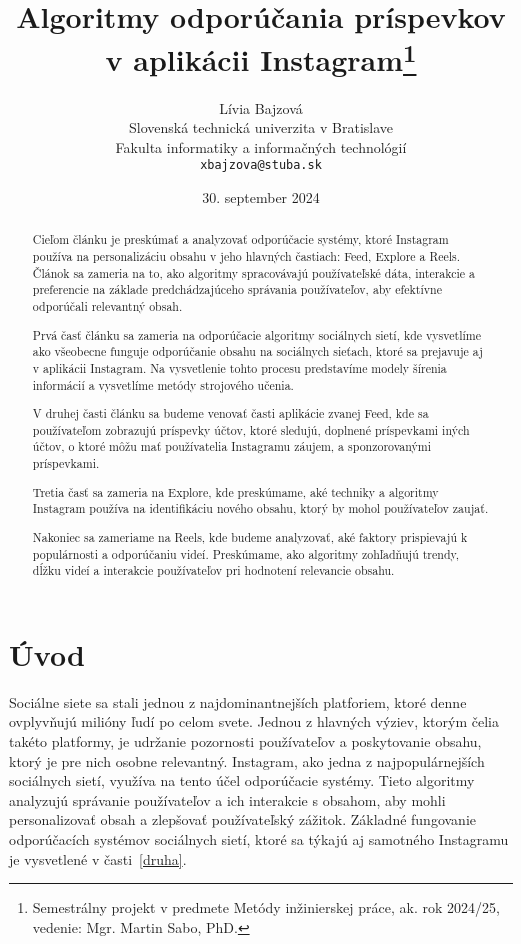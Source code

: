 \documentclass[10pt,twoside,slovak,a4paper]{article}
\title{Algoritmy odporúčania príspevkov v aplikácii Instagram\thanks{Semestrálny projekt v predmete Metódy inžinierskej práce, ak. rok 2024/25, vedenie: Mgr. Martin Sabo, PhD.}} %
\author{Lívia Bajzová\\[2pt]
	{\small Slovenská technická univerzita v Bratislave}\\
	{\small Fakulta informatiky a informačných technológií}\\
	{\small \texttt{xbajzova@stuba.sk}}
	}
\date{\small 30. september 2024} %
\begin{document}
\maketitle

\begin{abstract}
Cieľom článku je preskúmať a analyzovať odporúčacie systémy, ktoré Instagram používa na personalizáciu obsahu v jeho hlavných častiach: Feed, Explore a Reels. Článok sa zameria na to, ako algoritmy spracovávajú používateľské dáta, interakcie a preferencie na základe predchádzajúceho správania používateľov, aby efektívne odporúčali relevantný obsah.

Prvá časť článku sa zameria na odporúčacie algoritmy sociálnych sietí, kde vysvetlíme ako všeobecne funguje odporúčanie obsahu na sociálnych sieťach, ktoré sa prejavuje aj v aplikácii Instagram. Na vysvetlenie tohto procesu predstavíme modely šírenia informácií a vysvetlíme metódy strojového učenia.

V druhej časti článku sa budeme venovať časti aplikácie zvanej Feed, kde sa používateľom zobrazujú príspevky účtov, ktoré sledujú, doplnené príspevkami iných účtov, o ktoré môžu mať používatelia Instagramu záujem, a sponzorovanými príspevkami.

Tretia časť sa zameria na Explore, kde preskúmame, aké techniky a algoritmy Instagram používa na identifikáciu nového obsahu, ktorý by mohol používateľov zaujať.

Nakoniec sa zameriame na Reels, kde budeme analyzovať, aké faktory prispievajú k populárnosti a odporúčaniu videí. Preskúmame, ako algoritmy zohľadňujú trendy, dĺžku videí a interakcie používateľov pri hodnotení relevancie obsahu.



\end{abstract}



\section{Úvod}
Sociálne siete sa stali jednou z najdominantnejších platforiem, ktoré denne ovplyvňujú milióny ľudí po celom svete. Jednou z hlavných výziev, ktorým čelia takéto platformy, je udržanie pozornosti používateľov a poskytovanie obsahu, ktorý je pre nich osobne relevantný. Instagram, ako jedna z najpopulárnejších sociálnych sietí, využíva na tento účel odporúčacie systémy. Tieto algoritmy analyzujú správanie používateľov a ich interakcie s obsahom, aby mohli personalizovať obsah a zlepšovať používateľský zážitok. Základné fungovanie odporúčacích systémov sociálnych sietí, ktoré sa týkajú aj samotného Instagramu je vysvetlené v časti~\ref{druha}.
\end{document}
